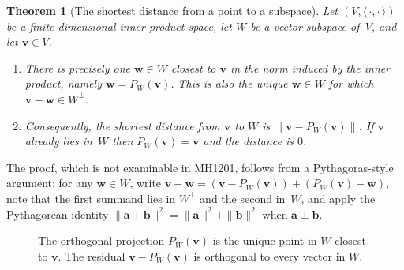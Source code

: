 \documentclass[11pt, a4paper, notitlepage]{report}
\newtheorem{theorem}{Theorem}[section]
\theoremstyle{definition}
\theoremstyle{remark}
\begin{document}
\begin{theorem}[The shortest distance from a point to a subspace]
\label{thm:shortest-distance}
Let $(V,\langle\,\cdot,\cdot\,\rangle)$ be a finite-dimensional inner
product space, let $W$ be a vector subspace of~$V$, and let $\mathbf{v}\in V$.
\begin{enumerate}
  \item There is precisely one $\mathbf{w}\in W$ closest to $\mathbf{v}$ in the
        norm induced by the inner product, namely $\mathbf{w} = P_W(\mathbf{v})$.
        This is also the unique $\mathbf{w}\in W$ for which $\mathbf{v}-\mathbf{w}\in W^\perp$.
  \item Consequently, the shortest distance from $\mathbf{v}$ to $W$ is
        $\|\mathbf{v} - P_W(\mathbf{v})\|$. If $\mathbf{v}$ already lies in~$W$
        then $P_W(\mathbf{v}) = \mathbf{v}$ and the distance is $0$.
\end{enumerate}
\end{theorem}

The proof, which is not examinable in MH1201, follows from a Pythagoras-style
argument: for any $\mathbf{w}\in W$, write $\mathbf{v} - \mathbf{w} = (\mathbf{v} - P_W(\mathbf{v})) + (P_W(\mathbf{v}) - \mathbf{w})$,
note that the first summand lies in $W^\perp$ and the second in~$W$, and apply
the Pythagorean identity $\|\mathbf{a}+\mathbf{b}\|^2 = \|\mathbf{a}\|^2 + \|\mathbf{b}\|^2$
when $\mathbf{a}\perp\mathbf{b}$.

\begin{figure}[h]
\centering
{}
\caption{The orthogonal projection $P_W(\mathbf{v})$ is the unique point in $W$
closest to $\mathbf{v}$. The residual $\mathbf{v} - P_W(\mathbf{v})$ is orthogonal
to every vector in $W$.}
\label{fig:orth-proj-operator}
\end{figure}
\end{document}
